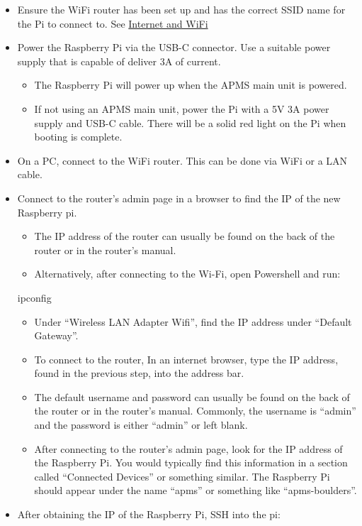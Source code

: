 \documentclass[
  letterpaper,
]{scrbook}
\newenvironment{Shaded}{\begin{snugshade}}{\end{snugshade}}
\newcommand{\ExtensionTok}[1]{\textcolor[rgb]{0.00,0.23,0.31}{#1}}
\begin{document}
\begin{itemize}
\item
  Ensure the WiFi router has been set up and has the correct SSID name
  for the Pi to connect to. See
  \hyperref[Internetux5cux2520andux5cux2520WiFi]{Internet and WiFi}
\item
  Power the Raspberry Pi via the USB-C connector. Use a suitable power
  supply that is capable of deliver 3A of current.

  \begin{itemize}
  \item
    The Raspberry Pi will power up when the APMS main unit is powered.
  \item
    If not using an APMS main unit, power the Pi with a 5V 3A power
    supply and USB-C cable. There will be a solid red light on the Pi
    when booting is complete.
  \end{itemize}
\item
  On a PC, connect to the WiFi router. This can be done via WiFi or a
  LAN cable.
\item
  Connect to the router's admin page in a browser to find the IP of the
  new Raspberry pi.

  \begin{itemize}
  \item
    The IP address of the router can usually be found on the back of the
    router or in the router's manual.
  \item
    Alternatively, after connecting to the Wi-Fi, open Powershell and
    run:
  \end{itemize}

\begin{Shaded}
\begin{Highlighting}[]
\ExtensionTok{ipconfig}
\end{Highlighting}
\end{Shaded}

  \begin{itemize}
  \item
    Under ``Wireless LAN Adapter Wifi'', find the IP address under
    ``Default Gateway''.
  \item
    To connect to the router, In an internet browser, type the IP
    address, found in the previous step, into the address bar.
  \item
    The default username and password can usually be found on the back
    of the router or in the router's manual. Commonly, the username is
    ``admin'' and the password is either ``admin'' or left blank.
  \item
    After connecting to the router's admin page, look for the IP address
    of the Raspberry Pi. You would typically find this information in a
    section called ``Connected Devices'' or something similar. The
    Raspberry Pi should appear under the name ``apms'' or something like
    ``apms-boulders''.
  \end{itemize}
\item
  After obtaining the IP of the Raspberry Pi, SSH into the pi:


\end{itemize}
\end{document}
